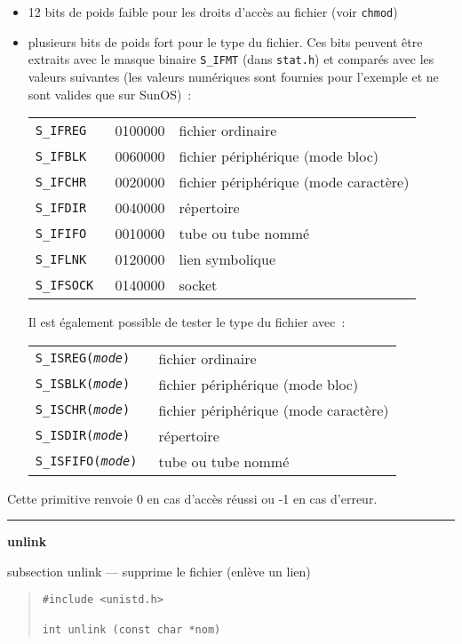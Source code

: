 \documentclass [twoside] {report}
\newcommand {\primitive} [1]
    {
	\phantomsection
	{\large \bf #1}
	\addcontentsline {toc} {subsection} {#1}
    }
\newcommand {\separation}
    {
	\vspace {5mm}
	\nopagebreak
	\hrule
    }
\begin{document}
\begin {itemize}
    \item 12 bits de poids faible pour les droits d'accès au fichier
	(voir {\tt chmod})
    \item plusieurs bits de poids fort pour le type du fichier. Ces bits
	peuvent être extraits avec le masque binaire {\tt S\_IFMT} (dans
	{\tt stat.h}) et comparés avec les valeurs suivantes (les valeurs
	numériques sont fournies pour l'exemple et ne sont valides que
	sur SunOS)~:

	\begin {tabular} {|lll|} \hline
	    \tt S\_IFREG & 0100000 & fichier ordinaire \\
	    \tt S\_IFBLK & 0060000 & fichier périphérique (mode bloc) \\
	    \tt S\_IFCHR & 0020000 & fichier périphérique (mode caractère) \\
	    \tt S\_IFDIR & 0040000 & répertoire \\
	    \tt S\_IFIFO & 0010000 & tube ou tube nommé \\
	    \tt S\_IFLNK & 0120000 & lien symbolique \\
	    \tt S\_IFSOCK & 0140000 & socket \\
	    \hline
	\end {tabular}

	Il est également possible de tester le type du fichier avec~:

	\begin {tabular} {|ll|} \hline
	    \tt S\_ISREG({\em mode}) & fichier ordinaire \\
	    \tt S\_ISBLK({\em mode}) & fichier périphérique (mode bloc) \\
	    \tt S\_ISCHR({\em mode}) & fichier périphérique (mode caractère) \\
	    \tt S\_ISDIR({\em mode}) & répertoire \\
	    \tt S\_ISFIFO({\em mode}) & tube ou tube nommé \\
	    \hline
	\end {tabular}

\end {itemize}

Cette primitive renvoie 0 en cas d'accès réussi
ou -1 en cas d'erreur.




\separation
\primitive {unlink} --- supprime le fichier (enlève un lien)

\begin {quote}
\begin {verbatim}
#include <unistd.h>

int unlink (const char *nom)
\end{verbatim}
\end {quote}
\end{document}
